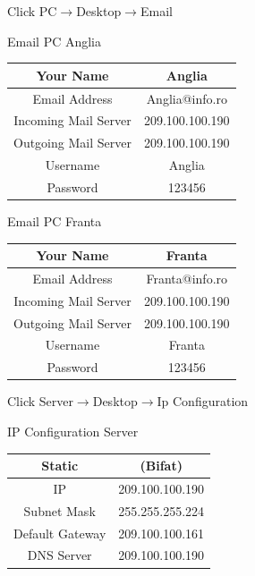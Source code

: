 \documentclass{article}
\begin{document}
Click PC$\rightarrow$Desktop$\rightarrow$Email

\begin{center}
    Email PC Anglia
\end{center}
\begin{center}
    \begin{tabular}{|c|c|}\hline
         Your Name & Anglia  \\ \hline 
         Email Address & Anglia@info.ro  \\ \hline
         Incoming Mail Server & 209.100.100.190 \\ \hline
         Outgoing Mail Server & 209.100.100.190 \\ \hline
         Username & Anglia \\ \hline
         Password & 123456 \\ \hline
    \end{tabular}
\end{center}


\begin{center}
    Email PC Franta
\end{center}
\begin{center}
    \begin{tabular}{|c|c|}\hline
         Your Name & Franta  \\ \hline 
         Email Address & Franta@info.ro  \\ \hline
         Incoming Mail Server & 209.100.100.190 \\ \hline
         Outgoing Mail Server & 209.100.100.190 \\ \hline
         Username & Franta \\ \hline
         Password & 123456 \\ \hline
    \end{tabular}
\end{center}


Click Server$\rightarrow$Desktop$\rightarrow$Ip Configuration
\begin{center}
    IP Configuration Server
\end{center}
\begin{center}
    \begin{tabular}{|c|c|}\hline
         Static & (Bifat)  \\ \hline \hline
         IP & 209.100.100.190  \\ \hline
         Subnet Mask & 255.255.255.224 \\ \hline
         Default Gateway & 209.100.100.161 \\ \hline
         DNS Server & 209.100.100.190 \\ \hline
    \end{tabular}
\end{center}
\end{document}
